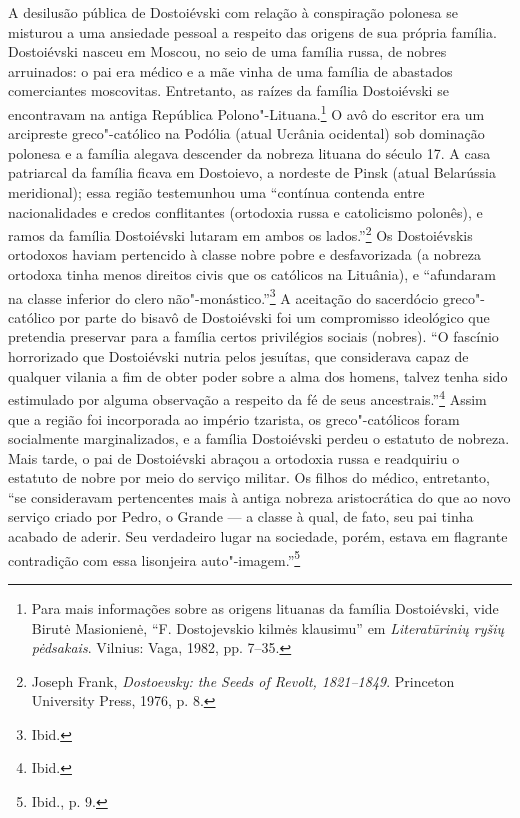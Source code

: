 A desilusão pública de Dostoiévski com relação à conspiração polonesa se
misturou a uma ansiedade pessoal a respeito das origens de sua própria
família. Dostoiévski nasceu em Moscou, no seio de uma família russa, de
nobres arruinados: o pai era médico e a mãe vinha de uma família de
abastados comerciantes moscovitas. Entretanto, as raízes da família
Dostoiévski se encontravam na antiga República Polono"-Lituana.\footnote{Para
  mais informações sobre as origens lituanas da família Dostoiévski,
  vide Birutė Masionienė, ``F. Dostojevskio kilmės klausimu'' em
  \emph{Literatūrinių ryšių pėdsakais}. Vilnius: Vaga, 1982, pp. 7--35.}
O avô do escritor era um arcipreste greco"-católico na Podólia (atual
Ucrânia ocidental) sob dominação polonesa e a família alegava descender
da nobreza lituana do século 17. A casa patriarcal da família ficava em
Dostoievo, a nordeste de Pinsk (atual Belarússia meridional); essa
região testemunhou uma ``contínua contenda entre nacionalidades e credos
conflitantes (ortodoxia russa e catolicismo polonês), e ramos da família
Dostoiévski lutaram em ambos os lados.''\footnote{Joseph Frank,
  \emph{Dostoevsky: the Seeds of Revolt, 1821--1849}. Princeton
  University Press, 1976, p. 8.} Os Dostoiévskis ortodoxos haviam
pertencido à classe nobre pobre e desfavorizada (a nobreza ortodoxa
tinha menos direitos civis que os católicos na Lituânia), e ``afundaram
na classe inferior do clero não"-monástico.''\footnote{Ibid.} A aceitação
do sacerdócio greco"-católico por parte do bisavô de Dostoiévski foi um
compromisso ideológico que pretendia preservar para a família certos
privilégios sociais (nobres). ``O fascínio horrorizado que Dostoiévski
nutria pelos jesuítas, que considerava capaz de qualquer vilania a fim
de obter poder sobre a alma dos homens, talvez tenha sido estimulado por
alguma observação a respeito da fé de seus ancestrais.''\footnote{Ibid.}
Assim que a região foi incorporada ao império tzarista, os
greco"-católicos foram socialmente marginalizados, e a família
Dostoiévski perdeu o estatuto de nobreza. Mais tarde, o pai de
Dostoiévski abraçou a ortodoxia russa e readquiriu o estatuto de nobre
por meio do serviço militar. Os filhos do médico, entretanto, ``se
consideravam pertencentes mais à antiga nobreza aristocrática do que ao
novo serviço criado por Pedro, o Grande --- a classe à qual, de fato, seu
pai tinha acabado de aderir. Seu verdadeiro lugar na sociedade, porém,
estava em flagrante contradição com essa lisonjeira
auto"-imagem.''\footnote{Ibid., p. 9.}

